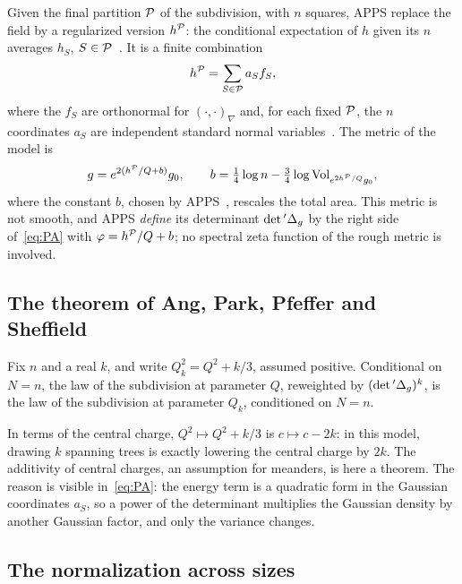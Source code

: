 Given the final partition $\mathcal{P}$ of the subdivision, with $n$ squares, APPS replace the field by a
regularized version $h^{\mathcal{P}}$: the conditional expectation of $h$ given its $n$ averages $h_S$,
$S\in\mathcal{P}$~\cite[Definition~6.4]{APPS}. It is a finite combination
\begin{equation}\label{eq:coords}
h^{\mathcal{P}}=\sum_{S\in\mathcal{P}}a_Sf_S ,
\end{equation}
where the $f_S$ are orthonormal for $(\cdot,\cdot)_\nabla$ and, for each fixed $\mathcal{P}$, the $n$
coordinates $a_S$ are independent standard normal variables~\cite[Lemma~6.5]{APPS}. The metric of
the model is
\[
g=e^{2(h^{\mathcal{P}}/Q+b)}g_0,\qquad b=\tfrac14\log n-\tfrac34\log\operatorname{Vol}_{e^{2h^{\mathcal{P}}/Q}g_0},
\]
where the constant $b$, chosen by APPS~\cite[Definition~6.7]{APPS}, rescales the total area. This
metric is not smooth, and APPS
\emph{define} its determinant $\det{}'\Delta_g$ by the right side of~\eqref{eq:PA} with
$\varphi=h^{\mathcal{P}}/Q+b$; no spectral zeta function of the rough metric is involved.


\subsection{The theorem of Ang, Park, Pfeffer and Sheffield}

\begin{theorem}\label{thm:apps69}
Fix $n$ and a real $k$, and write $Q_k^2=Q^2+k/3$, assumed positive. Conditional on $N=n$, the law of the
subdivision at parameter $Q$, reweighted by $(\det{}'\Delta_g)^k$, is the law of the subdivision at
parameter $Q_k$, conditioned on $N=n$.
\end{theorem}

In terms of the central charge, $Q^2\mapsto Q^2+k/3$ is $c\mapsto c-2k$: in this model, drawing $k$
spanning trees is exactly lowering the central charge by $2k$. The additivity of central charges,
an assumption for meanders, is here a theorem. The reason is visible in~\eqref{eq:PA}: the energy
term is a quadratic form in the Gaussian coordinates $a_S$, so a power of the determinant
multiplies the Gaussian density by another Gaussian factor, and only the variance changes.

\subsection{The normalization across sizes}

